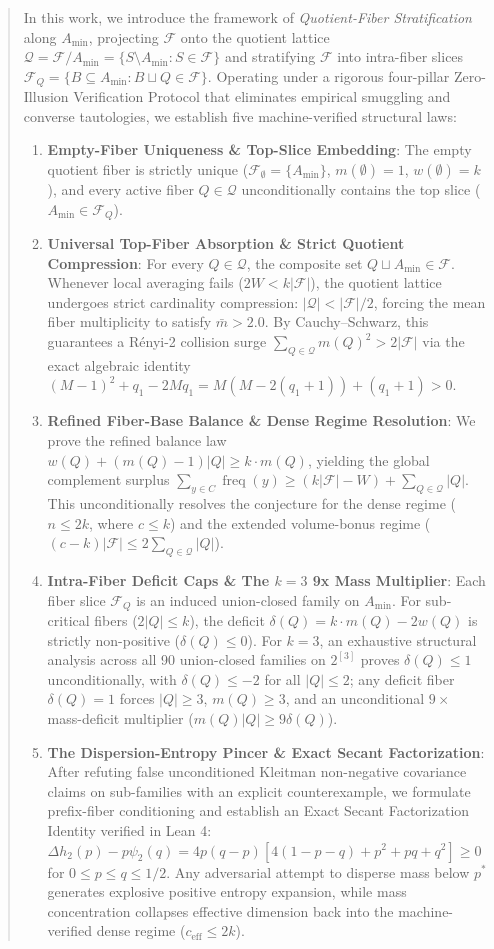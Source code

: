 \documentclass[11pt,a4paper]{article}
\theoremstyle{plain}
\theoremstyle{definition}
\theoremstyle{remark}
\newcommand{\F}{\mathcal{F}}
\newcommand{\Q}{\mathcal{Q}}
\newcommand{\freq}{\operatorname{freq}}
\begin{document}
\begin{abstract}
In this work, we introduce the framework of \emph{Quotient-Fiber Stratification} along $A_{\min}$, projecting $\F$ onto the quotient lattice $\Q = \F / A_{\min} = \{S \setminus A_{\min} : S \in \F\}$ and stratifying $\F$ into intra-fiber slices $\F_Q = \{B \subseteq A_{\min} : B \sqcup Q \in \F\}$. Operating under a rigorous four-pillar Zero-Illusion Verification Protocol that eliminates empirical smuggling and converse tautologies, we establish five machine-verified structural laws:
\begin{enumerate}
    \item \textbf{Empty-Fiber Uniqueness \& Top-Slice Embedding}: The empty quotient fiber is strictly unique ($\F_\emptyset = \{A_{\min}\}$, $m(\emptyset)=1$, $w(\emptyset)=k$), and every active fiber $Q \in \Q$ unconditionally contains the top slice ($A_{\min} \in \F_Q$).
    \item \textbf{Universal Top-Fiber Absorption \& Strict Quotient Compression}: For every $Q \in \Q$, the composite set $Q \sqcup A_{\min} \in \F$. Whenever local averaging fails ($2W < k|\F|$), the quotient lattice undergoes strict cardinality compression: $|\Q| < |\F|/2$, forcing the mean fiber multiplicity to satisfy $\bar{m} > 2.0$. By Cauchy--Schwarz, this guarantees a Rényi-2 collision surge $\sum_{Q \in \Q} m(Q)^2 > 2|\F|$ via the exact algebraic identity $(M-1)^2 + q_1 - 2M q_1 = M(M - 2(q_1+1)) + (q_1+1) > 0$.
    \item \textbf{Refined Fiber-Base Balance \& Dense Regime Resolution}: We prove the refined balance law $w(Q) + (m(Q)-1)|Q| \ge k \cdot m(Q)$, yielding the global complement surplus $\sum_{y \in C} \freq(y) \ge (k|\F| - W) + \sum_{Q \in \Q} |Q|$. This unconditionally resolves the conjecture for the dense regime ($n \le 2k$, where $c \le k$) and the extended volume-bonus regime ($(c - k)|\F| \le 2 \sum_{Q \in \Q} |Q|$).
    \item \textbf{Intra-Fiber Deficit Caps \& The $k=3$ 9x Mass Multiplier}: Each fiber slice $\F_Q$ is an induced union-closed family on $A_{\min}$. For sub-critical fibers ($2|Q| \le k$), the deficit $\delta(Q) = k \cdot m(Q) - 2 w(Q)$ is strictly non-positive ($\delta(Q) \le 0$). For $k=3$, an exhaustive structural analysis across all 90 union-closed families on $2^{[3]}$ proves $\delta(Q) \le 1$ unconditionally, with $\delta(Q) \le -2$ for all $|Q| \le 2$; any deficit fiber $\delta(Q) = 1$ forces $|Q| \ge 3$, $m(Q) \ge 3$, and an unconditional $9\times$ mass-deficit multiplier ($m(Q)|Q| \ge 9 \delta(Q)$).
    \item \textbf{The Dispersion-Entropy Pincer \& Exact Secant Factorization}: After refuting false unconditioned Kleitman non-negative covariance claims on sub-families with an explicit counterexample, we formulate prefix-fiber conditioning and establish an Exact Secant Factorization Identity verified in Lean 4: $\Delta h_2(p) - p \psi_2(q) = 4p(q-p)[4(1-p-q) + p^2 + pq + q^2] \ge 0$ for $0 \le p \le q \le 1/2$. Any adversarial attempt to disperse mass below $p^*$ generates explosive positive entropy expansion, while mass concentration collapses effective dimension back into the machine-verified dense regime ($c_{\text{eff}} \le 2k$).

\end{enumerate}
\end{abstract}
\end{document}
